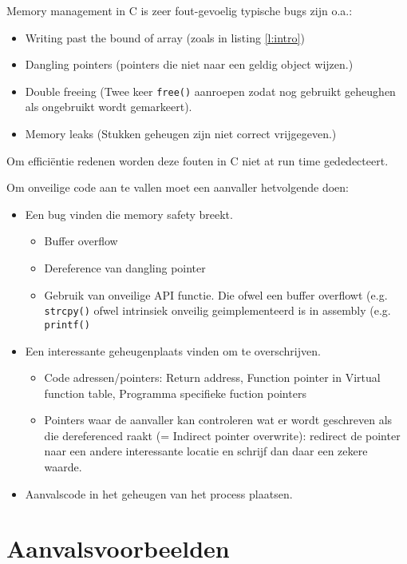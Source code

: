 \documentclass[../main.tex]{subfiles}
\begin{document}
Memory management in C is zeer fout-gevoelig typische bugs zijn o.a.:
\begin{itemize}
		\item Writing past the bound of array (zoals in listing \ref{l:intro})
		\item Dangling pointers (pointers die niet naar een geldig object wijzen.)
		\item Double freeing (Twee keer \lstinline[style=cstyle]{free()} aanroepen zodat nog gebruikt geheughen als ongebruikt wordt gemarkeert).
		\item Memory leaks (Stukken geheugen zijn niet correct vrijgegeven.)
\end{itemize}
Om effici\"entie redenen worden deze fouten in C niet at run time gededecteert.

Om onveilige code aan te vallen moet een aanvaller hetvolgende doen:
\begin{itemize}
		\item Een bug vinden die memory safety breekt.
				\begin{itemize}
						\item Buffer overflow
						\item Dereference van dangling pointer
						\item Gebruik van onveilige API functie. Die ofwel een buffer overflowt (e.g. \lstinline[style=cstyle]{strcpy()} ofwel intrinsiek onveilig geimplementeerd is in assembly (e.g. \lstinline[style=cstyle]{printf()}
				\end{itemize}
		\item Een interessante geheugenplaats vinden om te overschrijven.
				\begin{itemize}
								\item Code adressen/pointers: Return address, Function pointer in Virtual function table, Programma specifieke fuction pointers
								\item Pointers waar de aanvaller kan controleren wat er wordt geschreven als die dereferenced raakt (= Indirect pointer overwrite): redirect de pointer naar een andere interessante locatie en schrijf dan daar een zekere waarde.
				\end{itemize}
		\item Aanvalscode in het geheugen van het process plaatsen.
\end{itemize}

\section{Aanvalsvoorbeelden}
\end{document}
